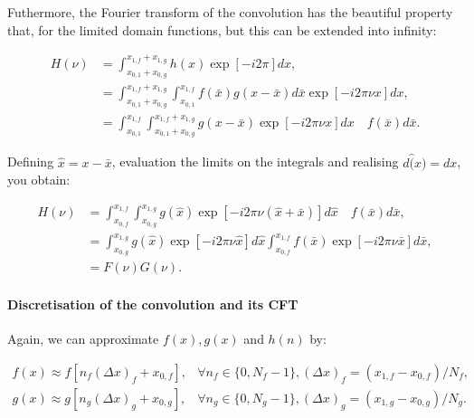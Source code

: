Futhermore, the Fourier transform of the convolution has the beautiful property that, for the limited domain functions, but this can be extended into infinity:

\begin{equation}\label{eq_conv_CFT}
	\begin{aligned}
		H(\nu) &= \int_{x_{0,1} + x_{0,g}}^{x_{1,f} + x_{1,g}} h(x) \operatorname{exp}\left[-i2\pi\right]dx,\\
		&= \int_{x_{0,1} + x_{0,g}}^{x_{1,f} + x_{1,g}} \int_{x_{0,1}}^{x_{1,f}} f(\bar{x})g(x-\bar{x}) d\bar{x} \operatorname{exp}\left[-i2\pi\nu x\right]dx,\\
		&= \int_{x_{0,1}}^{x_{1,f}} \int_{{x_{0,1} + x_{0,g}}}^{x_{1,f} + x_{1,g}} g(x-\bar{x}) \operatorname{exp}\left[-i2\pi\nu x\right] dx \quad f(\bar{x}) d\bar{x} .
	\end{aligned}
\end{equation}

Defining $\hat{x} = x-\bar{x}$, evaluation the limits on the integrals and realising $d\hat(x) = dx$, you obtain:

\begin{equation}
	\begin{aligned}
		H(\nu) &=\int_{x_{0,f}}^{x_{1,f}} \int_{x_{0,g}}^{x_{1,g}} g(\hat{x}) \operatorname{exp}\left[-i2\pi\nu(\hat{x} + \bar{x})\right] d\hat{x} \quad f(\bar{x}) d\bar{x}, \\
		&=  \int_{x_{0,g}}^{x_{1,g}} g(\hat{x}) \operatorname{exp}\left[-i2\pi\nu\hat{x}\right]  d\hat{x} \int_{x_{0,f}}^{x_{1,f}} f(\bar{x}) \operatorname{exp}\left[-i2\pi\nu\bar{x}\right] d\bar{x}, \\
		&= F(\nu) G(\nu).
	\end{aligned}
\end{equation}




\paragraph{Discretisation of the convolution and its CFT}
Again, we can approximate $f(x), g(x)$ and $h(n)$ by:

\begin{equation}
\begin{aligned}
	f(x) \approx f[n_f(\Delta x)_f + x_{0,f}], &\forall n_f \in \{0,N_f-1\}, (\Delta x)_f = (x_{1,f}-x_{0,f})/N_f,\\
	g(x) \approx g[n_g(\Delta x)_g + x_{0,g}], &\forall n_g \in \{0,N_g-1\}, (\Delta x)_g = (x_{1,g}-x_{0,g})/N_g.
\end{aligned}
\end{equation}

